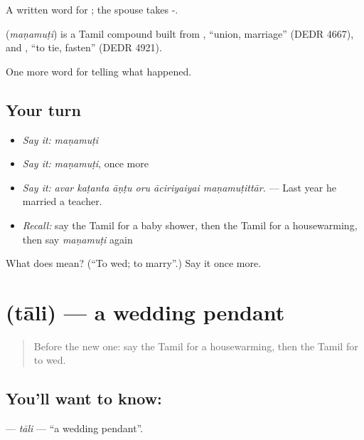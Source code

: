 A written word for  ; the spouse takes -.

\begin{cousinweb}
\textbf{} (\emph{maṇamuṭi}) is a Tamil compound built from , \textquotedblleft{}union, marriage\textquotedblright{} (DEDR 4667), and , \textquotedblleft{}to tie, fasten\textquotedblright{} (DEDR 4921).
\end{cousinweb}

\begin{grammarlens}[title={What you've built}]
One more word for telling what happened.
\end{grammarlens}

\subsection*{Your turn}
\begin{itemize}
\raggedright
  \item \emph{Say it:} \emph{maṇamuṭi}
  \item \emph{Say it:} \emph{maṇamuṭi}, once more
  \item \emph{Say it:} \emph{avar kaṭanta āṇṭu oru āciriyaiyai maṇamuṭittār.} — Last year he married a teacher.
  \item \emph{Recall:} say the Tamil for a baby shower, then the Tamil for a housewarming, then say \emph{maṇamuṭi} again
\end{itemize}

\begin{tcolorbox}[breakable,colback=teal!4,colframe=teal!35!black,title={Before you move on}]
What does  mean? (\textquotedblleft{}To wed; to marry\textquotedblright{}.) Say it once more.
\end{tcolorbox}
\section[\texorpdfstring{\ta{தாலி} (tāli)}{தாலி (tāli)}]{ (tāli) — a wedding pendant}

\label{lesson:TA-C322-tali}



\begin{quote}
Before the new one: say the Tamil for a housewarming, then the Tamil for to wed.
\end{quote}

\subsection*{You'll want to know: }
\textbf{} — \emph{tāli} — \textquotedblleft{}a wedding pendant\textquotedblright{}.

